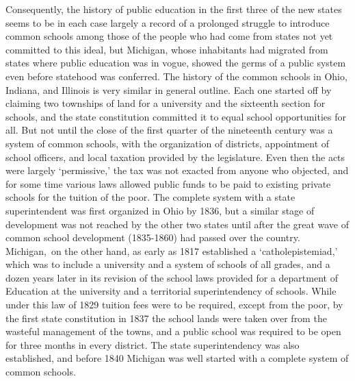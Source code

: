 \documentclass[
]{book}
\begin{document}
Consequently, the history of public education in the first three of the new states seems to be in each case largely a record of a prolonged struggle to introduce common schools among those of the people who had come from states not yet committed to this ideal, but Michigan, whose inhabitants had migrated from states where public education was in vogue, showed the germs of a public system even before statehood was conferred. The history of the common schools in Ohio, Indiana, and Illinois is very similar in general outline. Each one started off by claiming two townships of land for a university and the sixteenth section for schools, and the state constitution committed it to equal school opportunities for all. But not until the close of the first quarter of the nineteenth century was a system of common schools, with the organization of districts, appointment of school officers, and local taxation provided by the legislature. Even then the acts were largely `permissive,' the tax was not exacted from anyone who objected, and for some time various laws allowed public funds to be paid to existing private schools for the tuition of the poor. The complete system with a state superintendent was first organized in Ohio by 1836, but a similar stage of development was not reached by the other two states until after the great wave of common school development (1835-1860) had passed over the country. Michigan,~on the other hand, as early as 1817 established a `catholepistemiad,' which was to include a university and a system of schools of all grades, and a dozen years later in its revision of the school laws provided for a department of Education at the university and a territorial superintendency of schools. While under this law of 1829 tuition fees were to be required, except from the poor, by the first state constitution in 1837 the school lands were taken over from the wasteful management of the towns, and a public school was required to be open for three months in every district. The state superintendency was also established, and before 1840 Michigan was well started with a complete system of common schools.
\end{document}
